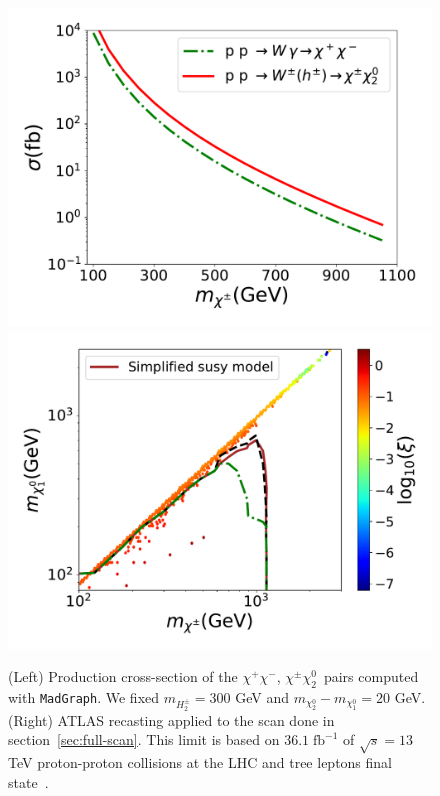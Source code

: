 \documentclass[12pt,letterpaper]{article}
\begin{document}
\begin{figure}[h]
\begin{center}
\includegraphics[scale=0.43]{sigma_pp_xx_MadGraph}
\includegraphics[scale=0.42]{compressed_spectra}
\caption{ (Left) Production cross-section of the $\chi^+\chi^-$, $\chi^{\pm}\chi_2^0\,$ pairs computed with \texttt{MadGraph}\cite{Alwall:2014hca}. We fixed $m_{H_2^{\pm}}=300$ GeV and $m_{\chi_2^0}-m_{\chi_1^0}=20$ GeV. 
(Right) ATLAS recasting applied to the scan done in section~\ref{sec:full-scan}. This limit is based on $36.1\; \text{fb}^{-1}$ of $\sqrt{s} = 13$ TeV proton-proton collisions at the LHC and tree leptons final state~\cite{Aaboud:2018jiw}. }
\label{fig:LHC}
\end{center}
\end{figure}
\end{document}
